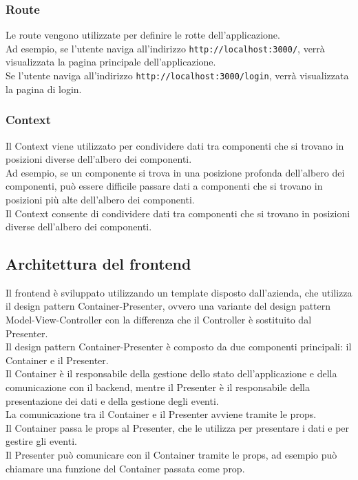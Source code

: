 \subsubsection{Route}
Le route vengono utilizzate per definire le rotte dell'applicazione.\\
Ad esempio, se l'utente naviga all'indirizzo \texttt{http://localhost:3000/}, verrà visualizzata la pagina principale dell'applicazione.\\
Se l'utente naviga all'indirizzo \texttt{http://localhost:3000/login}, verrà visualizzata la pagina di login.\\
\subsubsection{Context}
Il Context viene utilizzato per condividere dati tra componenti che si trovano in posizioni diverse dell'albero dei componenti.\\
Ad esempio, se un componente si trova in una posizione profonda dell'albero dei componenti, può essere difficile passare dati a componenti che si trovano in posizioni più alte dell'albero dei componenti.\\
Il Context consente di condividere dati tra componenti che si trovano in posizioni diverse dell'albero dei componenti.\\
\subsection{Architettura del frontend}
Il frontend è sviluppato utilizzando un template disposto dall'azienda, che utilizza il design pattern Container-Presenter, ovvero una variante del design pattern Model-View-Controller con la differenza che il Controller è sostituito dal Presenter.\\
Il design pattern Container-Presenter è composto da due componenti principali: il Container e il Presenter.\\
Il Container è il responsabile della gestione dello stato dell'applicazione e della comunicazione con il backend, mentre il Presenter è il responsabile della presentazione dei dati e della gestione degli eventi.\\
La comunicazione tra il Container e il Presenter avviene tramite le props.\\
Il Container passa le props al Presenter, che le utilizza per presentare i dati e per gestire gli eventi.\\
Il Presenter può comunicare con il Container tramite le props, ad esempio può chiamare una funzione del Container passata come prop.\\
